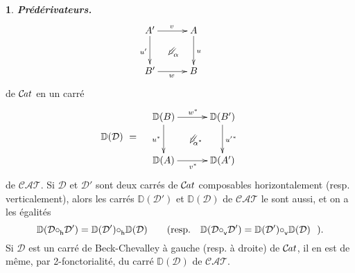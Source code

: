 \documentclass[francais]{smfart}
\theoremstyle{plain}
\theoremstyle{remark}
\theoremstyle{definition}
\newtheorem{paragr}[thm]{}
\numberwithin{equation}{thm}
\begin{document}
\begin{paragr} {\emph{\textbf{{Prédérivateurs}.\ }}}
\[{\UseTwocells
\xymatrixcolsep{2.5pc}
\xymatrixrowsep{2.4pc}
\xymatrix{
A'\ar[d]_{u'}\ar[r]^{v}
\drtwocell<\omit>{\alpha}
&A\ar[d]^{u}
\\
B'\ar[r]_{w}
&B
}
}\qquad
\]
de ${{\mathcal{C} \mspace{-2.mu} \it{at}}}$ en un carré
\[
{\mathbb{D}}(\mathcal{D})\ =\quad
\raise 23pt
\vbox{
\UseTwocells
\xymatrixcolsep{2.5pc}
\xymatrixrowsep{2.4pc}
\xymatrix{
{\mathbb{D}}(B)\ar[d]_{u^*}\ar[r]^{w^*}
\drtwocell<\omit>{\alpha^*}
&{\mathbb{D}}(B')\ar[d]^{{u'}^*}
\\
{\mathbb{D}}(A)\ar[r]_{v^*}
&{\mathbb{D}}(A')
}
}\qquad
\]
de ${\mathcal{CAT}}$. Si $\mathcal{D}$ et $\mathcal{D}'$ sont deux carrés de ${{\mathcal{C} \mspace{-2.mu} \it{at}}}$ composables horizontalement (resp. verticalement), alors les carrés ${\mathbb{D}}(\mathcal{D}')$ et ${\mathbb{D}}(\mathcal{D})$ de ${\mathcal{CAT}}$ le sont aussi, et on a les égalités
\begin{equation}
{\mathbb{D}}(\mathcal D{\circ^{}_{\mathsf h}}\mathcal D')={\mathbb{D}}(\mathcal D'){\circ^{}_{\mathsf h}}{\mathbb{D}}(\mathcal D)\qquad
\hbox{(resp.}\quad
{\mathbb{D}}(\mathcal D{\circ^{}_{\mathsf v}}\mathcal D')={\mathbb{D}}(\mathcal D'){\circ^{}_{\mathsf v}}{\mathbb{D}}(\mathcal D)
\ \ ).
\end{equation}
Si $\mathcal{D}$ est un carré de Beck-Chevalley à gauche (resp. à droite) de ${{\mathcal{C} \mspace{-2.mu} \it{at}}}$, il en est de même, par 2-fonctorialité, du carré ${\mathbb{D}}(\mathcal{D})$ de ${\mathcal{CAT}}$.
\end{paragr}
\end{document}
